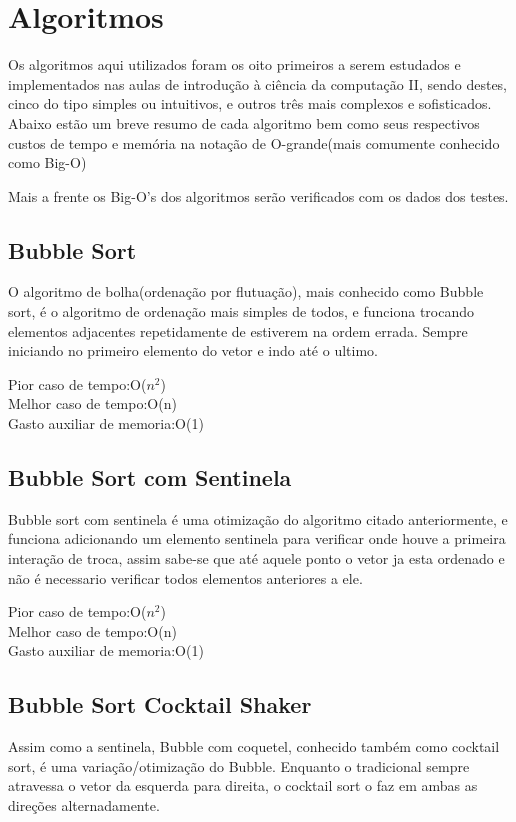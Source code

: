 \chapter{Algoritmos}
\label{chap:algoritmos}
Os algoritmos aqui utilizados foram os oito primeiros a serem estudados e implementados nas aulas de introdução à ciência da computação II, sendo destes, cinco do tipo simples ou intuitivos, e outros três mais complexos e sofisticados.\\

Abaixo estão um breve resumo de cada algoritmo bem como seus respectivos custos de tempo e memória na notação de O-grande(mais comumente conhecido como Big-O)

Mais a frente os Big-O's dos algoritmos serão verificados com os dados dos testes.

\section{Bubble Sort}
\label{sec:bubble_sort}
O algoritmo de bolha(ordenação por flutuação), mais conhecido como Bubble sort, é o algoritmo de ordenação mais simples de todos, e funciona trocando elementos adjacentes repetidamente de estiverem na ordem errada. Sempre iniciando no primeiro elemento do vetor e indo até o ultimo.
\cite{GeeksforGeeksBubble}

\noindent Pior caso de tempo:O($n^2$)\\
Melhor caso de tempo:O(n)\\
Gasto auxiliar de memoria:O(1)


\section{Bubble Sort com Sentinela}
\label{sec:bubble_sent}
Bubble sort com sentinela é uma otimização do algoritmo citado anteriormente, e funciona adicionando um elemento sentinela para verificar onde houve a primeira interação de troca, assim sabe-se que até aquele ponto o vetor ja esta ordenado e não é necessario verificar todos elementos anteriores a ele.

\noindent Pior caso de tempo:O($n^2$)\\
Melhor caso de tempo:O(n)\\
Gasto auxiliar de memoria:O(1)


\section{Bubble Sort Cocktail Shaker}
\label{sec:cocktail}
Assim como a sentinela, Bubble com coquetel, conhecido também como cocktail sort, é uma variação/otimização do Bubble. Enquanto o tradicional sempre atravessa o vetor da esquerda para direita, o cocktail sort o faz em ambas as direções alternadamente.

